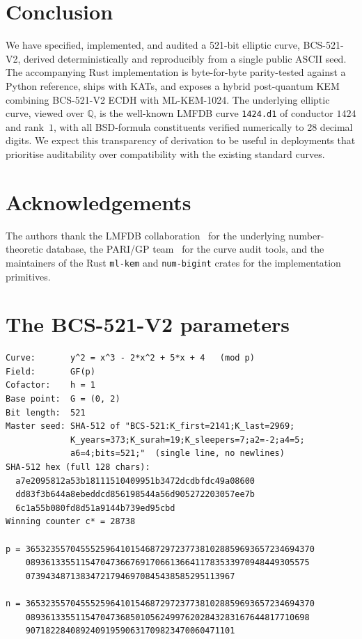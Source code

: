 \documentclass[11pt,a4paper]{article}
\theoremstyle{plain}
\theoremstyle{definition}
\newcommand{\Q}{\mathbb{Q}}
\newcommand{\BCSV}{\textsf{BCS\hbox{-}521\hbox{-}V2}}
\newcommand{\MLKEM}{\textsf{ML\hbox{-}KEM\hbox{-}1024}}
\begin{document}
\section{Conclusion}
\label{sec:conclusion}

We have specified, implemented, and audited a 521-bit elliptic curve,
\BCSV{}, derived deterministically and reproducibly from a single
public ASCII seed. The accompanying Rust implementation is
byte-for-byte parity-tested against a Python reference, ships with
KATs, and exposes a hybrid post-quantum KEM combining \BCSV{} ECDH
with \MLKEM{}. The underlying elliptic curve, viewed over $\Q$, is
the well-known LMFDB curve \texttt{1424.d1} of conductor $1424$ and
rank~$1$, with all BSD-formula constituents verified numerically to
28 decimal digits. We expect this transparency of derivation to be
useful in deployments that prioritise auditability over compatibility
with the existing standard curves.

\section*{Acknowledgements}

The authors thank the LMFDB collaboration~\cite{LMFDB} for the
underlying number-theoretic database, the PARI/GP team~\cite{PARI}
for the curve audit tools, and the maintainers of the Rust
\texttt{ml-kem} and \texttt{num-bigint} crates for the
implementation primitives.

\appendix

\section{The BCS-521-V2 parameters}
\label{app:params}

\begin{verbatim}
Curve:       y^2 = x^3 - 2*x^2 + 5*x + 4   (mod p)
Field:       GF(p)
Cofactor:    h = 1
Base point:  G = (0, 2)
Bit length:  521
Master seed: SHA-512 of "BCS-521:K_first=2141;K_last=2969;
             K_years=373;K_surah=19;K_sleepers=7;a2=-2;a4=5;
             a6=4;bits=521;"  (single line, no newlines)
SHA-512 hex (full 128 chars):
  a7e2095812a53b18111510409951b3472dcdbfdc49a08600
  dd83f3b644a8ebeddcd856198544a56d905272203057ee7b
  6c1a55b080fd8d51a9144b739ed95cbd
Winning counter c* = 28738

p = 3653235570455525964101546872972377381028859693657234694370
    089361335511547047366769170661366411783533970948449305575
    073943487138347217946970845438585295113967

n = 3653235570455525964101546872972377381028859693657234694370
    089361335511547047368501056249976202843283167644817710698
    907182284089240919590631709823470060471101
\end{verbatim}
\end{document}
